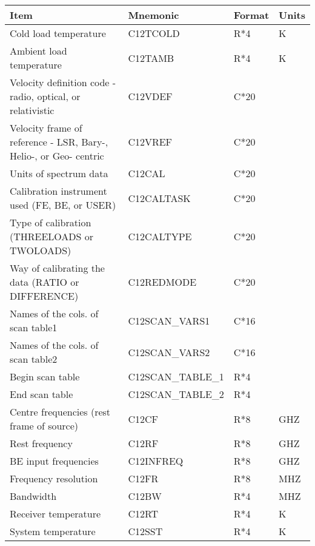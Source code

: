 \begin{tabular}{||l|l|l|l||} \hline
Item                                           & Mnemonic & Format & Units \\ \hline
Cold load temperature                          & C12TCOLD & R*4    & K     \\      
Ambient load temperature                       & C12TAMB  & R*4    & K     \\      
Velocity definition code - radio, optical, or relativistic & C12VDEF  & C*20   & ~     \\      
Velocity frame of reference - LSR, Bary-, Helio-, or Geo- centric   & C12VREF  & C*20  & ~     \\      
Units of spectrum data                         & C12CAL   & C*20   & ~     \\      
Calibration instrument used (FE, BE, or USER)  & C12CALTASK & C*20   & ~     \\      
Type of calibration (THREELOADS or TWOLOADS)   & C12CALTYPE & C*20   & ~     \\      
Way of calibrating the data (RATIO or DIFFERENCE) & C12REDMODE & C*20   & ~     \\      
Names of the cols. of scan table1              & C12SCAN\_VARS1 & C*16   & ~     \\      
Names of the cols. of scan table2              & C12SCAN\_VARS2 & C*16   & ~     \\      
Begin scan table                               & C12SCAN\_TABLE\_1 & R*4    &  ~    \\      
End scan table                                 & C12SCAN\_TABLE\_2 & R*4    &  ~    \\      
Centre frequencies (rest frame of source)      & C12CF      & R*8   & GHZ  \\      
Rest frequency                                 & C12RF      & R*8   & GHZ  \\      
BE input frequencies                           & C12INFREQ  & R*8   & GHZ  \\      
Frequency resolution                           & C12FR      & R*8    & MHZ  \\      
Bandwidth                                      & C12BW      & R*4    & MHZ  \\      
Receiver temperature                           & C12RT      & R*4    & K    \\      
System temperature                             & C12SST     & R*4    & K    \\      

\end{tabular}
